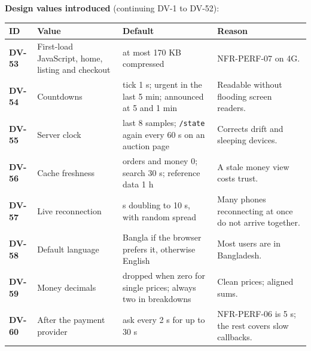 \documentclass[11pt,a4paper]{article}
\newenvironment{dtable}[1]{\small\begin{longtable}{#1}}{\end{longtable}}
\begin{document}
\textbf{Design values introduced} (continuing DV-1 to DV-52):
\begin{dtable}{@{}>{\bfseries}p{1.3cm}>{\raggedright\arraybackslash}p{4.4cm}>{\raggedright\arraybackslash}p{4.8cm}>{\raggedright\arraybackslash}p{4.4cm}@{}}
\toprule
\textnormal{\textbf{ID}} & \textbf{Value} & \textbf{Default} & \textbf{Reason} \\ \midrule \endhead
DV-53 & First-load JavaScript, home, listing and checkout & at most 170 KB compressed & NFR-PERF-07 on 4G. \\
DV-54 & Countdowns & tick 1 s; urgent in the last 5 min; announced at 5 and 1 min & Readable without flooding screen readers. \\
DV-55 & Server clock & last 8 samples; \texttt{/state} again every 60 s on an auction page & Corrects drift and sleeping devices. \\
DV-56 & Cache freshness & orders and money 0; search 30 s; reference data 1 h & A stale money view costs trust. \\
DV-57 & Live reconnection & 0.5 s doubling to 10 s, with random spread & Many phones reconnecting at once do not arrive together. \\
DV-58 & Default language & Bangla if the browser prefers it, otherwise English & Most users are in Bangladesh. \\
DV-59 & Money decimals & dropped when zero for single prices; always two in breakdowns & Clean prices; aligned sums. \\
DV-60 & After the payment provider & ask every 2 s for up to 30 s & NFR-PERF-06 is 5 s; the rest covers slow callbacks. \\
\bottomrule
\end{dtable}
\end{document}
